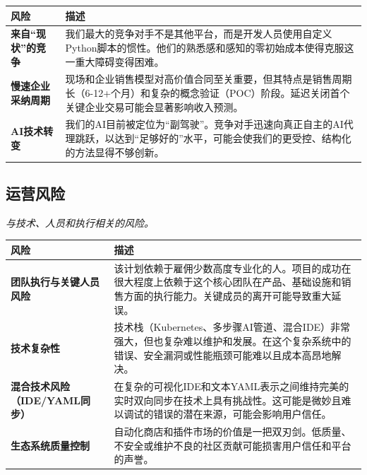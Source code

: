 \documentclass[11pt, a4paper, oneside]{article}
\begin{document}
\begin{table}[H]
\centering
\begin{tabularx}{\textwidth}{@{}lL@{}}
\toprule
\textbf{风险} & \textbf{描述} \\
\midrule
\textbf{来自“现状”的竞争} & 我们最大的竞争对手不是其他平台，而是开发人员使用自定义Python脚本的惯性。他们的熟悉感和感知的零初始成本使得克服这一重大障碍变得困难。 \\
\addlinespace
\textbf{慢速企业采纳周期} & 现场和企业销售模型对高价值合同至关重要，但其特点是销售周期长（6-12+个月）和复杂的概念验证（POC）阶段。延迟关闭首个关键企业交易可能会显著影响收入预测。 \\
\addlinespace
\textbf{AI技术转变} & 我们的AI目前被定位为“副驾驶”。竞争对手迅速向真正自主的AI代理跳跃，以达到“足够好的”水平，可能会使我们的更受控、结构化的方法显得不够创新。 \\
\bottomrule
\end{tabularx}




\end{table}

\subsection{运营风险}
\textit{与技术、人员和执行相关的风险。}

\begin{table}[H]
\centering
\begin{tabularx}{\textwidth}{@{}lL@{}}
\toprule
\textbf{风险} & \textbf{描述} \\
\midrule
\textbf{团队执行与关键人员风险} & 该计划依赖于雇佣少数高度专业化的人。项目的成功在很大程度上依赖于这个核心团队在产品、基础设施和销售方面的执行能力。关键成员的离开可能导致重大延误。 \\
\addlinespace
\textbf{技术复杂性} & 技术栈（Kubernetes、多步骤AI管道、混合IDE）非常强大，但也复杂难以维护和发展。在这个复杂系统中的错误、安全漏洞或性能瓶颈可能难以且成本高昂地解决。 \\
\addlinespace
\textbf{混合技术风险（IDE/YAML同步）} & 在复杂的可视化IDE和文本YAML表示之间维持完美的实时双向同步在技术上具有挑战性。这可能是微妙且难以调试的错误的潜在来源，可能会影响用户信任。 \\
\addlinespace
\textbf{生态系统质量控制} & 自动化商店和插件市场的价值是一把双刃剑。低质量、不安全或维护不良的社区贡献可能损害用户信任和平台的声誉。 \\
\bottomrule
\end{tabularx}
\end{table}
\end{document}
